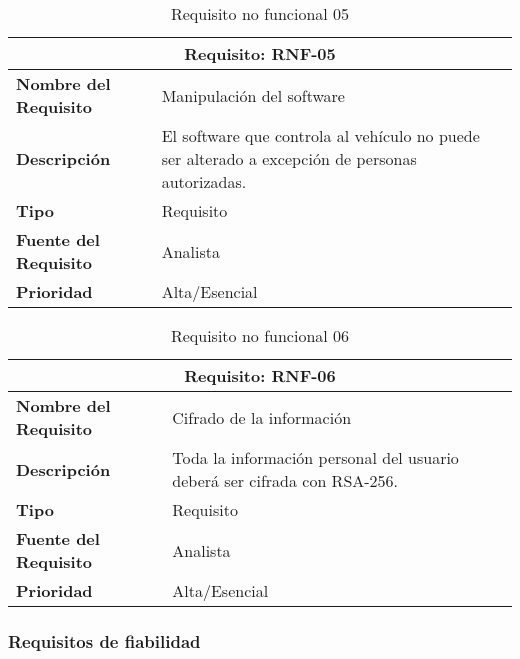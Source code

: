 \begin{table}[H]
\begin{center}
\begin{tabular}{p{} p{7cm}}
\multicolumn{2}{c}{\textbf{Requisito: RNF-05} } \\
\hline \hline
\textbf{Nombre del Requisito} & Manipulación del software\\
\hline
\textbf{Descripción} & El software que controla al vehículo no puede ser alterado a excepción de personas autorizadas.\\
\hline
\textbf{Tipo} & Requisito  \\
\hline
\textbf{Fuente del Requisito} & Analista  \\
\hline
\textbf{Prioridad} & Alta/Esencial \\ \hline
\end{tabular}
\caption{Requisito no funcional 05}
\label{tab:RNF-05}
\end{center}
\end{table}

\begin{table}[H]
\begin{center}
\begin{tabular}{p{} p{7cm}}
\multicolumn{2}{c}{\textbf{Requisito: RNF-06} } \\
\hline \hline
\textbf{Nombre del Requisito} & Cifrado de la información\\
\hline
\textbf{Descripción} & Toda la información personal del usuario deberá ser cifrada con RSA-256.\\
\hline
\textbf{Tipo} & Requisito  \\
\hline
\textbf{Fuente del Requisito} & Analista  \\
\hline
\textbf{Prioridad} & Alta/Esencial \\ \hline
\end{tabular}
\caption{Requisito no funcional 06}
\label{tab:RNF-06}
\end{center}
\end{table}

\subsubsection{Requisitos de fiabilidad}

